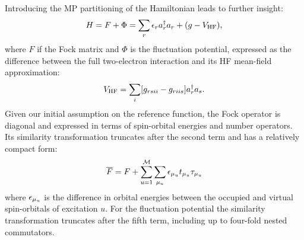 Introducing the \gls{MP} partitioning of the Hamiltonian leads to
further insight:
\begin{equation}
 H = F + \Phi = \sum_r\epsilon_ra_{r}^{\dagger}a_{r} + (g- V_\mathrm{HF}),
\end{equation}
where $F$ if the Fock matrix and $\Phi$ is the fluctuation potential,
expressed as the difference between the full two-electron interaction
and its \gls{HF} mean-field approximation:
\begin{equation}
 V_\mathrm{HF} = \sum_{i}[g_{rsii} - g_{riis}]a_{r}^{\dagger}a_{s}.
\end{equation}
Given our initial assumption on the reference function, the Fock
operator is diagonal and expressed in terms of spin-orbital energies and
number operators.
Its similarity transformation truncates after the second term and has a
relatively compact form:
\begin{equation}
  \overline{F} = F + \sum_{u=1}^\mathcal{M}\sum_{\mu_u}\epsilon_{\mu_u}t_{\mu_u}\tau_{\mu_u}
\end{equation}
where $\epsilon_{\mu_u}$ is the difference in orbital energies between the
occupied and virtual spin-orbitals of excitation $u$.
For the fluctuation potential the similarity transformation truncates
after the fifth term, including up to four-fold nested commutators.


